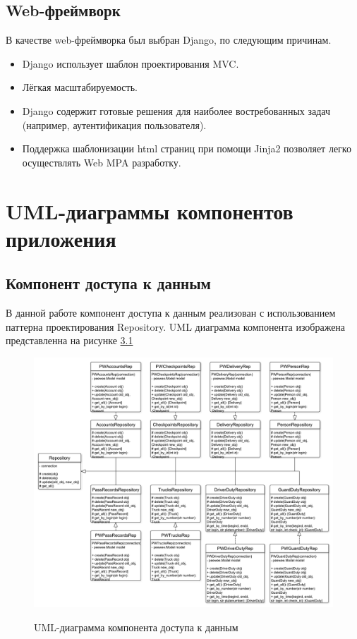 \subsection{Web-фреймворк}
В качестве web-фреймворка был выбран Django, по следующим причинам.
\begin{itemize}
	\item Django использует шаблон проектирования MVC.
	\item Лёгкая масштабируемость.
	\item Django содержит готовые решения для наиболее востребованных задач (например, аутентификация пользователя).
	\item Поддержка шаблонизации html страниц при помощи Jinja2 позволяет легко осуществлять Web MPA разработку.
\end{itemize}

\section{UML-диаграммы компонентов приложения}
\newpage
\subsection{Компонент доступа к данным}
В данной работе компонент доступа к данным реализован с использованием паттерна проектирования Repository. UML диаграмма компонента изображена представленна на рисунке \hyperref[rep_pic]{3.1}  

\begin{figure}[h!] \label{rep_pic}
	\begin{center}
		{\includegraphics[scale=0.4, angle=0]{uml/repsoitory.pdf}}
		\caption{UML-диаграмма компонента доступа к данным}
	\end{center}
\end{figure}

